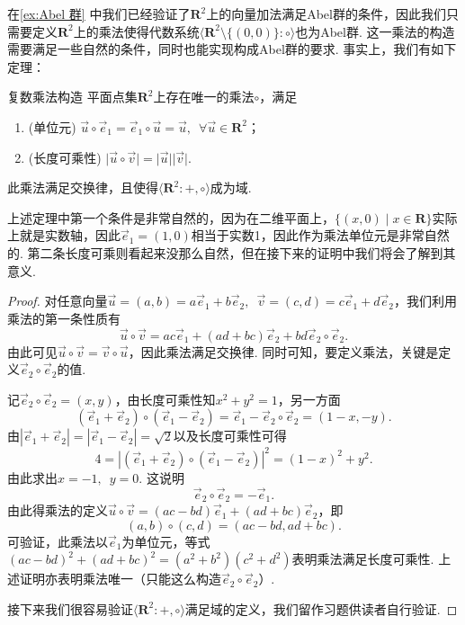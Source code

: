 在\autoref{ex:Abel 群} 中我们已经验证了$\mathbf{R}^2$上的向量加法满足Abel群的条件，因此我们只需要定义$\mathbf{R}^2$上的乘法使得代数系统$\langle\mathbf{R}^2\setminus\{(0,0)\}\colon\circ\rangle$也为Abel群. 这一乘法的构造需要满足一些自然的条件，同时也能实现构成Abel群的要求. 事实上，我们有如下定理：
\begin{theorem}{}{复数乘法构造}
    平面点集$\mathbf{R}^2$上存在唯一的乘法$\circ$，满足
    \begin{enumerate}
        \item (单位元) $\vec{u}\circ\vec{e}_1=\vec{e}_1\circ\vec{u}=\vec{u},\enspace\forall\vec{u}\in\mathbf{R}^2$；

        \item (长度可乘性) $\lvert\vec{u}\circ\vec{v}\rvert=\lvert\vec{u}\rvert\lvert\vec{v}\rvert$.
    \end{enumerate}
    此乘法满足交换律，且使得$\langle\mathbf{R}^2\colon+,\circ\rangle$成为域.
\end{theorem}

上述定理中第一个条件是非常自然的，因为在二维平面上，$\{(x,0) \mid x\in\mathbf{R}\}$实际上就是实数轴，因此$\vec{e}_1=(1,0)$相当于实数1，因此作为乘法单位元是非常自然的. 第二条长度可乘则看起来没那么自然，但在接下来的证明中我们将会了解到其意义.

\begin{proof}
    对任意向量$\vec{u}=(a,b)=a\vec{e}_1+b\vec{e}_2,\enspace \vec{v}=(c,d)=c\vec{e}_1+d\vec{e}_2$，我们利用乘法的第一条性质有
    \[\vec{u}\circ\vec{v}=ac\vec{e}_1+(ad+bc)\vec{e}_2+bd\vec{e}_2\circ\vec{e}_2.\]
    由此可见$\vec{u}\circ\vec{v}=\vec{v}\circ\vec{u}$，因此乘法满足交换律. 同时可知，要定义乘法，关键是定义$\vec{e}_2\circ\vec{e}_2$的值.

    记$\vec{e}_2\circ\vec{e}_2=(x,y)$，由长度可乘性知$x^2+y^2=1$，另一方面
    \[(\vec{e}_1+\vec{e}_2)\circ(\vec{e}_1-\vec{e}_2)=\vec{e}_1-\vec{e}_2\circ\vec{e}_2=(1-x,-y).\]
    由$|\vec{e}_1+\vec{e}_2|=|\vec{e}_1-\vec{e}_2|=\sqrt{2}$以及长度可乘性可得
    \[4=|(\vec{e}_1+\vec{e}_2)\circ(\vec{e}_1-\vec{e}_2)|^2=(1-x)^2+y^2.\]
    由此求出$x=-1,\enspace y=0$. 这说明
    \[\vec{e}_2\circ\vec{e}_2=-\vec{e}_1.\]
    由此得乘法的定义$\vec{u}\circ\vec{v}=(ac-bd)\vec{e}_1+(ad+bc)\vec{e}_2$，即
    \[(a,b)\circ(c,d)=(ac-bd,ad+bc).\]
    可验证，此乘法以$\vec{e}_1$为单位元，等式$(ac-bd)^2+(ad+bc)^2=(a^2+b^2)(c^2+d^2)$表明乘法满足长度可乘性. 上述证明亦表明乘法唯一（只能这么构造$\vec{e}_2\circ\vec{e}_2$）.

    接下来我们很容易验证$\langle\mathbf{R}^2\colon+,\circ\rangle$满足域的定义，我们留作习题供读者自行验证.
\end{proof}

